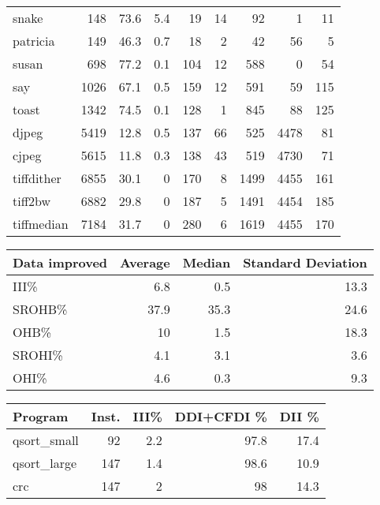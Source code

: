 \begin{tabular}{lrrrrrrrr}
 snake           &      148 &     73.6 &    5.4 &   19 &   14 &     92 &     1 &    11 \\
 patricia        &      149 &     46.3 &    0.7 &   18 &    2 &     42 &    56 &     5 \\
 susan           &      698 &     77.2 &    0.1 &  104 &   12 &    588 &     0 &    54 \\
 say             &     1026 &     67.1 &    0.5 &  159 &   12 &    591 &    59 &   115 \\
 toast           &     1342 &     74.5 &    0.1 &  128 &    1 &    845 &    88 &   125 \\
 djpeg           &     5419 &     12.8 &    0.5 &  137 &   66 &    525 &  4478 &    81 \\
 cjpeg           &     5615 &     11.8 &    0.3 &  138 &   43 &    519 &  4730 &    71 \\
 tiffdither      &     6855 &     30.1 &    0   &  170 &    8 &   1499 &  4455 &   161 \\
 tiff2bw         &     6882 &     29.8 &    0   &  187 &    5 &   1491 &  4454 &   185 \\
 tiffmedian      &     7184 &     31.7 &    0   &  280 &    6 &   1619 &  4455 &   170 \\
\hline
\end{tabular}\begin{tabular}{lrrr}
\hline
 Data improved   &   Average &   Median &   Standard Deviation \\
\hline
 III\%            &       6.8 &      0.5 &                 13.3 \\
 SROHB\%          &      37.9 &     35.3 &                 24.6 \\
 OHB\%            &      10   &      1.5 &                 18.3 \\
 SROHI\%          &       4.1 &      3.1 &                  3.6 \\
 OHI\%            &       4.6 &      0.3 &                  9.3 \\
\hline
\end{tabular}\begin{tabular}{lrrrr}
\hline
 Program         &   Inst. &   III\% &   DDI+CFDI \% &   DII \% \\
\hline
 qsort\_small     &      92 &    2.2 &         97.8 &    17.4 \\
 qsort\_large     &     147 &    1.4 &         98.6 &    10.9 \\
 crc             &     147 &    2   &         98   &    14.3 \\

\end{tabular}
